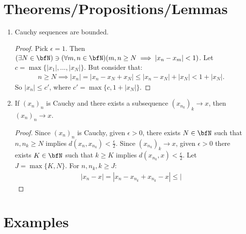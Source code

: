 \section*{Theorems/Propositions/Lemmas}
    \begin{enumerate}[label = (\arabic*)]
        \item Cauchy sequences are bounded.
            {\color{red} \begin{proof}
                Pick $\epsilon = 1$. Then $(\exists N \in \bfN) \ni (\forall m,n \in \bfN)(m,n \geq N \implies |x_n - x_m| < 1)$. Let $c = \max\{|x_1|,...,|x_N| \}$. But consider that:
                    \begin{equation*}
                    \begin{split}
                        n \geq N \implies |x_n| = |x_n - x_N + x_N| \leq |x_n - x_N| + |x_N| < 1 + |x_N|.
                    \end{split}
                    \end{equation*}
                So $|x_n| \leq c'$, where $c' = \max\{c,1 + |x_N|\}$.
            \end{proof}}

        \item If $(x_n)_n$ is Cauchy and there exists a subsequence $(x_{n_k})_k \rightarrow x$, then $(x_n)_n \rightarrow x$.
            \begin{proof}
                Since $(x_n)_n$ is Cauchy, given $\epsilon > 0$, there exists $N \in \bfN$ such that $n,n_k \geq N$ implies $d(x_n,x_{n_k}) < \frac{\epsilon}{2}$. Since $(x_{n_k})_k \rightarrow x$, given $\epsilon > 0$ there exists $K \in \bfN$ such that $k \geq K$ implies $d(x_{n_k},x) < \frac{\epsilon}{2}$. Let $J = \max\{K,N\}$. For $n,n_k,k \geq J$:
                    \begin{equation*}
                    \begin{split}
                        |x_n - x| = |x_n - x_{n_k} + x_{n_k} - x| \leq |
                    \end{split}
                    \end{equation*}
            \end{proof}
    \end{enumerate}
\section*{Examples}
